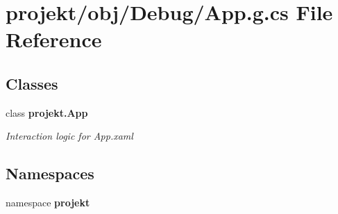 \section{projekt/obj/\+Debug/\+App.g.\+cs File Reference}
\label{Debug_2App_8g_8cs}
\subsection*{Classes}
\begin{DoxyCompactItemize}
\item 
class \textbf{ projekt.\+App}
\begin{DoxyCompactList}\small\item\em Interaction logic for App.\+xaml \end{DoxyCompactList}\end{DoxyCompactItemize}
\subsection*{Namespaces}
\begin{DoxyCompactItemize}
\item 
namespace \textbf{ projekt}
\end{DoxyCompactItemize}

